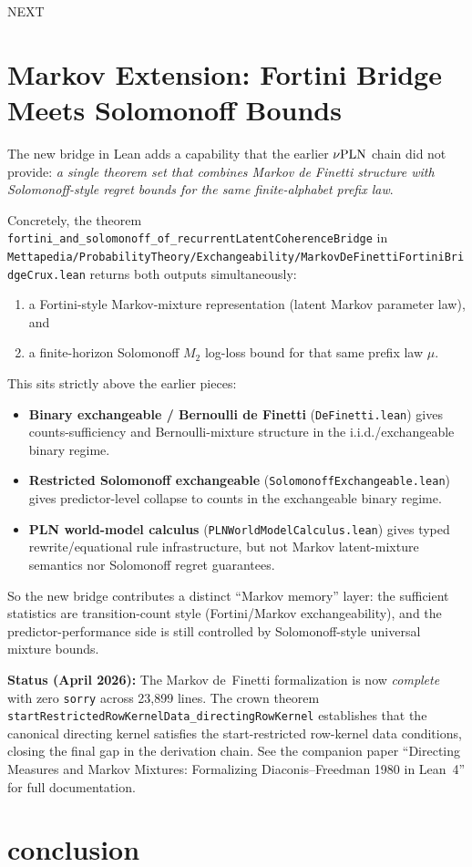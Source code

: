 \documentclass[]{article}
\begin{document}
NEXT

\section{Markov Extension: Fortini Bridge Meets Solomonoff Bounds}
\label{sec:markov-fortini-solomonoff}

The new bridge in Lean adds a capability that the earlier $\nu\textup{PLN}$ chain did not provide:
\emph{a single theorem set that combines Markov de Finetti structure
with Solomonoff-style regret bounds for the same finite-alphabet prefix law}.

Concretely, the theorem
\texttt{fortini\_and\_solomonoff\_of\_recurrentLatentCoherenceBridge}
in \texttt{Mettapedia/ProbabilityTheory/Exchangeability/MarkovDeFinettiFortiniBridgeCrux.lean}
returns both outputs simultaneously:
\begin{enumerate}
\item a Fortini-style Markov-mixture representation (latent Markov parameter law), and
\item a finite-horizon Solomonoff $M_2$ log-loss bound
for that same prefix law $\mu$.
\end{enumerate}

This sits strictly above the earlier pieces:
\begin{itemize}
\item \textbf{Binary exchangeable / Bernoulli de Finetti} (\texttt{DeFinetti.lean}) gives
counts-sufficiency and Bernoulli-mixture structure in the i.i.d./exchangeable binary regime.
\item \textbf{Restricted Solomonoff exchangeable} (\texttt{SolomonoffExchangeable.lean}) gives
predictor-level collapse to counts in the exchangeable binary regime.
\item \textbf{PLN world-model calculus} (\texttt{PLNWorldModelCalculus.lean}) gives
typed rewrite/equational rule infrastructure, but not Markov latent-mixture semantics
nor Solomonoff regret guarantees.
\end{itemize}

So the new bridge contributes a distinct ``Markov memory'' layer:
the sufficient statistics are transition-count style (Fortini/Markov exchangeability),
and the predictor-performance side is still controlled by Solomonoff-style universal
mixture bounds.

\textbf{Status (April 2026):} The Markov de~Finetti formalization is now
\emph{complete} with zero \texttt{sorry} across 23,899 lines. The crown theorem
\texttt{startRestrictedRowKernelData\_directingRowKernel} establishes that the
canonical directing kernel satisfies the start-restricted row-kernel data
conditions, closing the final gap in the derivation chain. See the companion
paper ``Directing Measures and Markov Mixtures: Formalizing Diaconis--Freedman
1980 in Lean~4'' for full documentation.

\section{conclusion}



\end{document}
